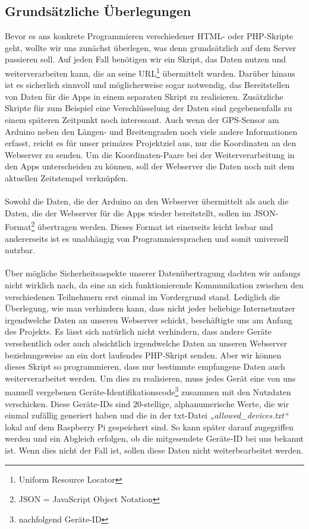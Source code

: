 \subsection{Grundsätzliche Überlegungen}
Bevor es ans konkrete Programmieren verschiedener HTML- oder PHP-Skripte geht, wollte wir uns zunächst überlegen, was denn grundsätzlich auf dem Server passieren soll. Auf jeden Fall benötigen wir ein Skript, das Daten nutzen und weiterverarbeiten kann, die an seine URL\footnote{Uniform Resource Locator} übermittelt wurden. Darüber hinaus ist es sicherlich sinnvoll und möglicherweise sogar notwendig, das Bereitstellen von Daten für die Apps in einem separaten Skript zu realisieren. Zusätzliche Skripte für zum Beispiel eine Verschlüsselung der Daten sind gegebenenfalls zu einem späteren Zeitpunkt noch interessant.
Auch wenn der GPS-Sensor am Arduino neben den Längen- und Breitengraden noch viele andere Informationen erfasst, reicht es für unser primäres Projektziel aus, nur die Koordinaten an den Webserver zu senden. Um die Koordinaten-Paare bei der Weiterverarbeitung in den Apps unterscheiden zu können, soll der Webserver die Daten noch mit dem aktuellen Zeitstempel verknüpfen.
\\
\\
Sowohl die Daten, die der Arduino an den Webserver übermittelt als auch die Daten, die der Webserver für die Apps wieder bereitstellt, sollen im JSON-Format\footnote{JSON = JavaScript Object Notation} übertragen werden. Dieses Format ist einerseits leicht lesbar und andererseits ist es unabhängig von Programmiersprachen und somit universell nutzbar.
\\
\\
Über mögliche Sicherheitsaspekte unserer Datenübertragung dachten wir anfangs nicht wirklich nach, da eine an sich funktionierende Kommunikation zwischen den verschiedenen Teilnehmern erst einmal im Vordergrund stand. Lediglich die Überlegung, wie man verhindern kann, dass nicht jeder beliebige Internetnutzer irgendwelche Daten an unseren Webserver schickt, beschäftigte uns am Anfang des Projekts. Es lässt sich natürlich nicht verhindern, dass andere Geräte versehentlich oder auch absichtlich irgendwelche Daten an unseren Webserver beziehungsweise an ein dort laufendes PHP-Skript senden. Aber wir können dieses Skript so programmieren, dass nur bestimmte empfangene Daten auch weiterverarbeitet werden. Um dies zu realisieren, muss jedes Gerät eine von uns manuell vergebenen Geräte-Identifikationscode\footnote{nachfolgend Geräte-ID} zusammen mit den Nutzdaten verschicken. Diese Geräte-IDs sind 20-stellige, alphanumerische Werte, die wir einmal zufällig generiert haben und die in der txt-Datei \textit{„allowed\_devices.txt“} lokal auf dem Raspberry Pi gespeichert sind. So kann später darauf zugegriffen werden und ein Abgleich erfolgen, ob die mitgesendete Geräte-ID bei uns bekannt ist. Wenn dies nicht der Fall ist, sollen diese Daten nicht weiterbearbeitet werden.
